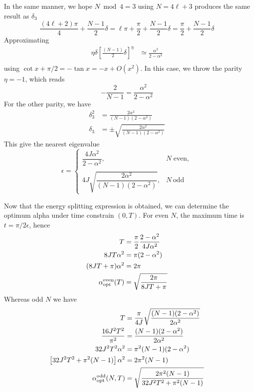 \documentclass[../../../main.tex]{subfiles}
\begin{document}
In the same manner, we hope $N\bmod4=3$ using $N=4\ell+3$ produces the same result as $\delta_3$
\begin{equation*}
  \frac{(4\ell+2)\pi}{4}+\frac{N-1}{2}\delta
  =\ell\pi+ \frac{\pi}{2}+\frac{N-1}{2}\delta
  = \frac{\pi}{2}+\frac{N-1}{2}\delta
\end{equation*}
Approximating
\begin{align*}
  \eta\delta
  \left[
    \frac{(N-1)}{2}\delta
    \right]^\eta
   & \simeq \frac{\alpha^2}{2-\alpha^2} \\
\end{align*}
using $\cot x+\pi/2=-\tan x = -x+O(x^2)$.
In this case, we throw the parity $\eta=-1$, which reads
\begin{equation*}
  -\frac{2}{N-1} = \frac{\alpha^2}{2-\alpha^2}
\end{equation*}
For the other parity, we have
\begin{align*}
  \delta_3^2 & =  \frac{2\alpha^2} {(N-1)(2-\alpha^2)}              \\
  \delta_3   & =  \pm \sqrt{ \frac{2\alpha^2} {(N-1)(2-\alpha^2)} }
\end{align*}
This give the nearest eigenvalue
\begin{equation*}
  \epsilon = \begin{cases} \dfrac{4J\alpha^2}{2-\alpha^2},                & N\; \mathrm{even}, \\\\
              4J\sqrt{\dfrac{2\alpha^2}{(N-1)(2-\alpha^2)}}, & N\ \mathrm{odd}
  \end{cases}
\end{equation*}

Now that the energy splitting expression is obtained, we can determine the optimum alpha under time constrain $(0,T)$.
For even $N$, the maximum time is $t=\pi/2\epsilon$, hence
\begin{align*}
  T                              & =  \frac{\pi}{2} \frac{2-\alpha^2}{4J\alpha^2} \\
  8JT\alpha^2                    & = \pi(2-\alpha^2)                              \\
  (8JT+\pi)\alpha^2              & = 2\pi                                         \\
  \alpha_{\rm opt}^{\rm even}(T) & =  \sqrt{\frac{2\pi}{8JT+\pi}}
\end{align*}
Whereas odd $N$ we have
\begin{align*}
  T                                          & = \frac{\pi}{4J} \sqrt{ \frac{(N-1)(2-\alpha^2)} {2\alpha^2} } \\
  \frac{16J^2T^2}{\pi^2}                     & = \frac{(N-1)(2-\alpha^2)} {2\alpha^2}                         \\
  32J^2T^2\alpha^2                           & = \pi^2(N-1)(2-\alpha^2)                                       \\
  \left[ 32J^2T^2+\pi^2(N-1) \right]\alpha^2 & = 2\pi^2(N-1)                                                  \\
  \alpha_{\rm opt}^{\rm odd}(N,T)            & = \sqrt{ \frac{2\pi^2(N-1)} {32J^2T^2+\pi^2(N-1)} }
\end{align*}
\end{document}
